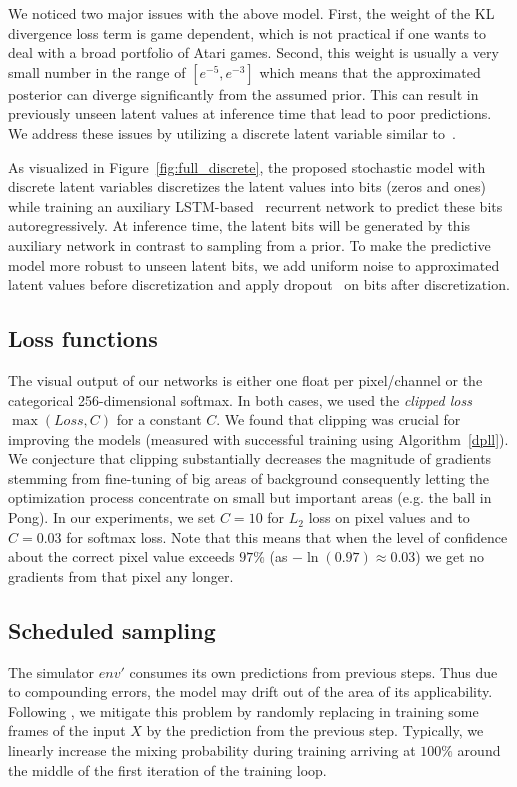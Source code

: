 We noticed two major issues with the above model. First, the weight of the KL divergence loss term is game dependent, which is not practical if one wants to deal with a broad portfolio of Atari games. Second, this weight is usually a very small number in the range of $[e^{-5}, e^{-3}]$ which means that the approximated posterior can diverge significantly from the assumed prior. This can result in previously unseen latent values at inference time that lead to poor predictions. We address these issues by utilizing a discrete latent variable similar to~\citet{auto_discrete}.

As visualized in Figure~\ref{fig:full_discrete}, the proposed stochastic model with discrete latent variables discretizes the latent values into bits (zeros and ones) while training an auxiliary LSTM-based~\cite{hochreiter1997long} recurrent network to predict these bits autoregressively. At inference time, the latent bits will be generated by this auxiliary network in contrast to sampling from a prior. To make the predictive model more robust to unseen latent bits, we add uniform noise to approximated latent values before discretization and apply dropout~\cite{srivastava2014dropout} on bits after discretization.

\subsection{Loss functions}
The visual output of our networks is either one float per pixel/channel or the categorical 256-dimensional softmax. In both cases, we used the \textit{clipped loss} $\max(Loss, C)$ for a constant $C$. We found that clipping was crucial for improving the models (measured with successful training using Algorithm~\ref{dpll}). We conjecture that clipping substantially decreases the magnitude of gradients stemming from fine-tuning of big areas of background consequently letting the optimization process concentrate on small but important areas (e.g. the ball in Pong). In our experiments, we set $C=10$ for $L_2$ loss on pixel values and to $C=0.03$ for softmax loss.
Note that this means that when the level of confidence about the correct pixel value exceeds $97\%$  (as $-\ln(0.97) \approx 0.03$) we get no gradients from that pixel any longer.

\subsection{Scheduled sampling}
The simulator $env'$ consumes its own predictions from previous steps. Thus due to compounding errors, the model may drift out of the area of its applicability. Following \cite{BengioVJS15,venkatraman}, we mitigate this problem by randomly replacing in training some frames of the input $X$ by the prediction from the previous step. Typically, we linearly increase the mixing probability during training arriving at $100\%$ around the middle of the first iteration of the training loop.

